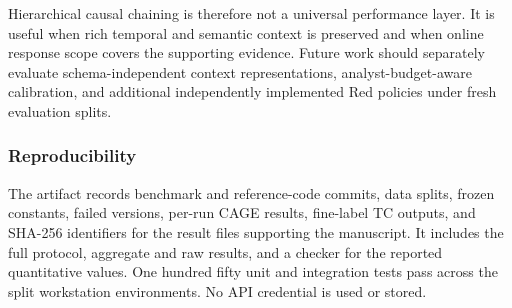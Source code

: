 \documentclass[runningheads]{llncs}
\begin{document}
Hierarchical causal chaining is therefore not a universal performance layer. It is useful when rich temporal and semantic context is preserved and when online response scope covers the supporting evidence. Future work should separately evaluate schema-independent context representations, analyst-budget-aware calibration, and additional independently implemented Red policies under fresh evaluation splits.

\subsubsection{Reproducibility}
The artifact records benchmark and reference-code commits, data splits, frozen constants, failed versions, per-run CAGE results, fine-label TC outputs, and SHA-256 identifiers for the result files supporting the manuscript. It includes the full protocol, aggregate and raw results, and a checker for the reported quantitative values. One hundred fifty unit and integration tests pass across the split workstation environments. No API credential is used or stored.



\end{document}
